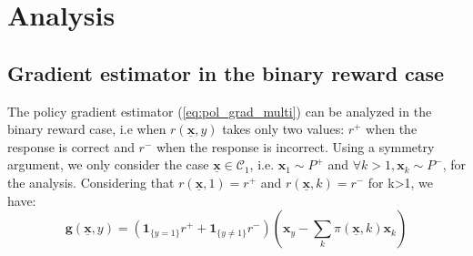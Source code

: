 \documentclass[conference]{IEEEtran}
\begin{document}




\section{Analysis}\label{sec:analysis}
\subsection{Gradient estimator in the binary reward case}\label{sec:analysis-1}

The policy gradient estimator (\ref{eq:pol_grad_multi}) can be analyzed in the binary reward case, 
i.e when $r(\underline{\mathbf{x}},y)$ takes only two values: $r^+$ when the response is correct and $r^-$ when the response is
incorrect. Using a symmetry argument, we only consider the case $\underline{\mathbf{x}} \in \mathcal{C}_1$, i.e. 
$\boldsymbol{x}_1 \sim P^+$ and $\forall k>1, \boldsymbol{x}_k \sim P^-$, for the analysis.
Considering that $r(\underline{\mathbf{x}},1) = r^+$ and  $r(\underline{\mathbf{x}},k)=r^-$ for k>1,
we have:
$$\boldsymbol{g}(\underline{\mathbf{x}}, y) = (\mathbf{1}_{\{y=1\}} r^+ + \mathbf{1}_{\{y\neq 1\}}r^-) \left(\boldsymbol{x}_y - \sum_k  \pi(\underline{\mathbf{x}},k)\boldsymbol{x}_k\right) $$
\end{document}
